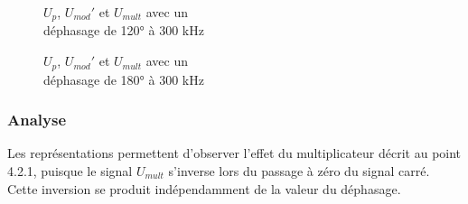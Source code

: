 \begin{figure}[H]
    \begin{minipage}[c]{.50\linewidth}
        \centering
        \caption{$U_{p}$, $U_{mod}'$ et $U_{mult}$ avec un\\ déphasage de 120° à 300 kHz }
    \label{fig:oc23}
    \end{minipage}
    \hfill%
    \begin{minipage}[c]{.50\linewidth}
        \centering
       \caption{$U_{p}$, $U_{mod}'$ et $U_{mult}$ avec un \\ déphasage de 180° à 300 kHz}
 \label{fig:oc24}
    \end{minipage}
\end{figure}

\subsubsection{Analyse}

Les représentations permettent d’observer l’effet du multiplicateur  
décrit au point 4.2.1, puisque le signal \( U_{mult} \) s’inverse lors du passage à zéro du signal carré.  
Cette inversion se produit indépendamment de la valeur du déphasage. \\

